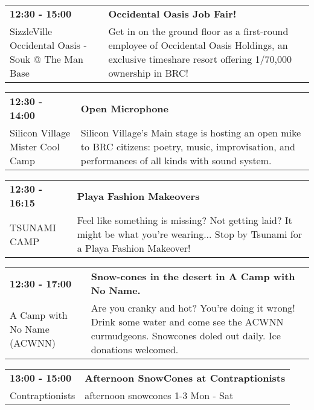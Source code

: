 \begin{tabular}{ p{1in} p{2.2in} }
    \textbf{12:30 - 15:00} & \textbf{Occidental Oasis Job Fair!} \\
    SizzleVille \newline Occidental Oasis - Souk @ The Man Base & Get in on the ground floor as a first-round employee of Occidental Oasis Holdings, an exclusive timeshare resort offering 1/70,000 ownership in BRC! \\
    \hline 
\end{tabular}
    
\begin{tabular}{ p{1in} p{2.2in} }
    \textbf{12:30 - 14:00} & \textbf{Open Microphone} \\
    Silicon Village \newline Mister Cool Camp & Silicon Village's Main stage is hosting an open mike to BRC citizens: poetry, music, improvisation, and performances of all kinds with sound system. \\
    \hline 
\end{tabular}
    
\begin{tabular}{ p{1in} p{2.2in} }
    \textbf{12:30 - 16:15} & \textbf{Playa Fashion Makeovers} \\
    TSUNAMI CAMP \newline  & Feel like something is missing?  Not getting laid?  It might be what you're wearing...  Stop by Tsunami for a Playa Fashion Makeover! \\
    \hline 
\end{tabular}
    
\begin{tabular}{ p{1in} p{2.2in} }
    \textbf{12:30 - 17:00} & \textbf{Snow-cones in the desert in A Camp with No Name.} \\
    A Camp with No Name (ACWNN) \newline  & Are you cranky and hot? You're doing it wrong! Drink some water and come see the ACWNN curmudgeons. Snowcones doled out daily. Ice donations welcomed. \\
    \hline 
\end{tabular}
    
\begin{tabular}{ p{1in} p{2.2in} }
    \textbf{13:00 - 15:00} & \textbf{Afternoon SnowCones at Contraptionists} \\
    Contraptionists \newline  & afternoon snowcones 1-3 Mon - Sat \\
    \hline 
\end{tabular}
    
